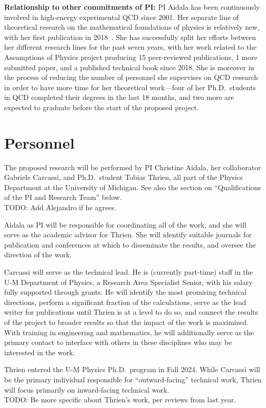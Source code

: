 \noindent
\textbf{Relationship to other commitments of PI:} PI Aidala has been continuously involved in high-energy experimental QCD since 2001.  Her separate line of theoretical research on the mathematical foundations of physics is relatively new, with her first publication in 2018~\cite{aop-phys-blueprint}. She has successfully split her efforts between her different research lines for the past seven years, with her work related to the Assumptions of Physics project producing 15 peer-reviewed publications, 1 more submitted paper, and a published technical book since 2018.  She is moreover in the process of reducing the number of personnel she supervises on QCD research in order to have more time for her theoretical work---four of her Ph.D.~students in QCD completed their degrees in the last 18 months, and two more are expected to graduate before the start of the proposed project.  




\section{Personnel}
The proposed research will be performed by PI Christine Aidala, her collaborator Gabriele Carcassi, and Ph.D.~student Tobias Thrien, all part of the Physics Department at the University of Michigan.  See also the section on ``Qualifications of the PI and Research Team'' below.  \\
TODO: Add Alejandro if he agrees.

Aidala as PI will be responsible for coordinating all of the work, and she will serve as the academic advisor for Thrien.  She will identify suitable journals for publication and conferences at which to disseminate the results, and oversee the direction of the work.  

Carcassi will serve as the technical lead.  He is (currently part-time) staff in the U-M Department of Physics, a Research Area Specialist Senior, with his salary fully supported through grants.  He will identify the most promising technical directions, perform a significant fraction of the calculations, serve as the lead writer for publications until Thrien is at a level to do so, and connect the results of the project to broader results so that the impact of the work is maximized.  With training in engineering and mathematics, he will additionally serve as the primary contact to interface with others in these disciplines who may be interested in the work.

Thrien entered the U-M Physics Ph.D.~program in Fall 2024.  While Carcassi will be the primary individual responsible for ``outward-facing'' technical work, Thrien will focus primarily on inward-facing technical work.  \\
TODO: Be more specific about Thrien's work, per reviews from last year.



